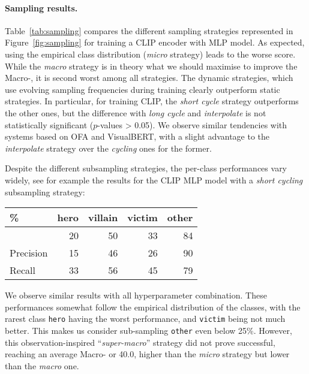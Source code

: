 \paragraph{Sampling results.}
Table~\ref{tab:sampling} compares the different sampling strategies represented in Figure~\ref{fig:sampling} for training a CLIP encoder with MLP model. As expected, using the empirical class distribution (\textsl{micro} strategy) leads to the worse score.
While the \textsl{macro} strategy is in theory what we should maximise to improve the Macro-\fone{}, it is second worst among all strategies.
The dynamic strategies, which use evolving sampling frequencies during training clearly outperform static strategies.
In particular, for training CLIP, the \textsl{short cycle} strategy outperforms the other ones, but the difference with \textsl{long cycle} and \textsl{interpolate} is not statistically significant (\(p\)-values > 0.05).
We observe similar tendencies with systems based on OFA and VisualBERT, with a slight advantage to the \textsl{interpolate} strategy over the \textsl{cycling} ones for the former.

Despite the different subsampling strategies, the per-class performances vary widely, see for example the results for the CLIP MLP model with a \textsl{short cycling} subsampling strategy:
\begin{center}
\begin{tabular}{l r r r r}
\toprule
\% & hero & villain & victim & other \\
\midrule
\fone{} & 20 & 50 & 33 & 84 \\
Precision & 15 & 46 & 26 & 90 \\
Recall & 33 & 56 & 45 & 79 \\
\bottomrule
\end{tabular}
\end{center}
We observe similar results with all hyperparameter combination.
These performances somewhat follow the empirical distribution of the classes, with the rarest class \texttt{hero} having the worst performance, and \texttt{victim} being not much better.
This makes us consider sub-sampling \texttt{other} even below 25\%.
However, this observation-inspired ``\textsl{super-macro}'' strategy did not prove successful, reaching an average Macro-\fone{} or 40.0, higher than the \textsl{micro} strategy but lower than the \textsl{macro} one.

